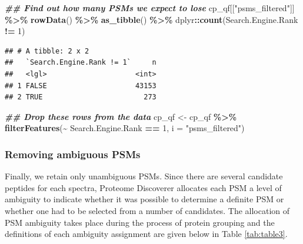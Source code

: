 \documentclass[9pt,a4paper,]{extarticle}
\newenvironment{Shaded}{\begin{snugshade}}{\end{snugshade}}
\newcommand{\AttributeTok}[1]{\textcolor[rgb]{0.13,0.29,0.53}{#1}}
\newcommand{\DecValTok}[1]{\textcolor[rgb]{0.00,0.00,0.81}{#1}}
\newcommand{\DocumentationTok}[1]{\textcolor[rgb]{0.56,0.35,0.01}{\textbf{\textit{#1}}}}
\newcommand{\FunctionTok}[1]{\textcolor[rgb]{0.13,0.29,0.53}{\textbf{#1}}}
\newcommand{\NormalTok}[1]{#1}
\newcommand{\OtherTok}[1]{\textcolor[rgb]{0.56,0.35,0.01}{#1}}
\newcommand{\SpecialCharTok}[1]{\textcolor[rgb]{0.81,0.36,0.00}{\textbf{#1}}}
\newcommand{\StringTok}[1]{\textcolor[rgb]{0.31,0.60,0.02}{#1}}
\begin{document}
\begin{Shaded}
\begin{Highlighting}[]
\DocumentationTok{\#\# Find out how many PSMs we expect to lose}
\NormalTok{cp\_qf[[}\StringTok{"psms\_filtered"}\NormalTok{]] }\SpecialCharTok{\%\textgreater{}\%} 
  \FunctionTok{rowData}\NormalTok{() }\SpecialCharTok{\%\textgreater{}\%} 
  \FunctionTok{as\_tibble}\NormalTok{() }\SpecialCharTok{\%\textgreater{}\%} 
\NormalTok{  dplyr}\SpecialCharTok{::}\FunctionTok{count}\NormalTok{(Search.Engine.Rank }\SpecialCharTok{!=} \DecValTok{1}\NormalTok{)}
\end{Highlighting}
\end{Shaded}

\begin{verbatim}
## # A tibble: 2 x 2
##   `Search.Engine.Rank != 1`     n
##   <lgl>                     <int>
## 1 FALSE                     43153
## 2 TRUE                        273
\end{verbatim}

\begin{Shaded}
\begin{Highlighting}[]
\DocumentationTok{\#\# Drop these rows from the data}
\NormalTok{cp\_qf }\OtherTok{\textless{}{-}}\NormalTok{ cp\_qf }\SpecialCharTok{\%\textgreater{}\%}
  \FunctionTok{filterFeatures}\NormalTok{(}\SpecialCharTok{\textasciitilde{}}\NormalTok{ Search.Engine.Rank }\SpecialCharTok{==} \DecValTok{1}\NormalTok{,}
                 \AttributeTok{i =} \StringTok{"psms\_filtered"}\NormalTok{)}
\end{Highlighting}
\end{Shaded}

\hypertarget{removing-ambiguous-psms}{%
\subsubsection{Removing ambiguous PSMs}\label{removing-ambiguous-psms}}

Finally, we retain only unambiguous PSMs. Since there are several candidate
peptides for each spectra, Proteome Discoverer allocates each PSM a level of
ambiguity to indicate whether it was possible to determine a definite PSM or
whether one had to be selected from a number of candidates. The allocation of
PSM ambiguity takes place during the process of protein grouping and the
definitions of each ambiguity assignment are given below in Table
\ref{tab:table3}.
\end{document}
